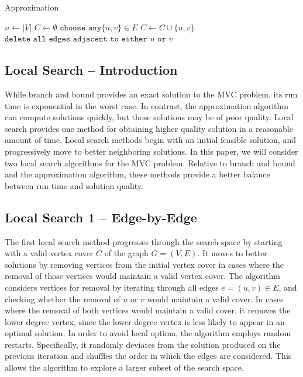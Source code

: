 \documentclass{sig-alternate-05-2015}
\begin{document}
\begin{algorithm}
\LinesNumbered
\DontPrintSemicolon
\BlankLine
 

\caption{Approximation}

\BlankLine
\Begin
{
	$ n \leftarrow |V|$\;
	$ C \leftarrow \emptyset$ \;
	{
		$\texttt{choose any} \lbrace u,v \rbrace \in E$\;
		$ C \leftarrow C \cup \lbrace u,v \rbrace$\;
		$\texttt{delete all edges adjacent to either } u \texttt{ or } v$\;
	}
	\;
}
\end{algorithm}

\subsection{Local Search -- Introduction}
While branch and bound provides an exact solution to the MVC problem, its run time is exponential in the worst case. In contrast, the approximation algorithm can compute solutions quickly, but those solutions may be of poor quality. Local search provides one method for obtaining higher quality solution in a reasonable amount of time. Local search methods begin with an initial feasible solution, and progressively move to better neighboring solutions. In this paper, we will consider two local search algorithms for the MVC problem. Relative to branch and bound and the approximation algorithm, these methods provide a better balance between run time and solution quality.

\subsection{Local Search 1 -- Edge-by-Edge}
The first local search method progresses through the search space by starting with a valid vertex cover $C$ of the graph $G=(V,E)$. It moves to better solutions by removing vertices from the initial vertex cover in cases where the removal of those vertices would maintain a valid vertex cover. The algorithm considers vertices for removal by iterating through all edges $e=(u,v) \in E$, and checking whether the removal of $u$ or $v$ would maintain a valid cover. In cases where the removal of both vertices would maintain a valid cover, it removes the lower degree vertex, since the lower degree vertex is less likely to appear in an optimal solution. In order to avoid local optima, the algorithm employs random restarts. Specifically, it randomly deviates from the solution produced on the previous iteration and shuffles the order in which the edges are considered. This allows the algorithm to explore a larger subset of the search space.
\end{document}
